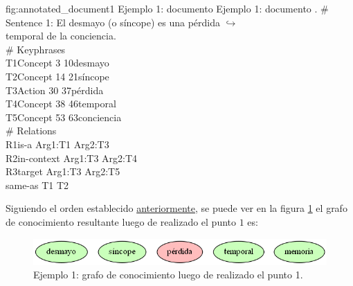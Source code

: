 \begin{annexample}
[backgroundcolor=cyan!13]
{\textwidth}
{fig:annotated_document1}
{Ejemplo 1: documento }
{Ejemplo 1: documento .}
	\# Sentence 1: El desmayo (o síncope) es una pérdida {\scriptsize $\hookrightarrow$}\\
	temporal de la conciencia.\\
	\# Keyphrases\\
	T1\space\space Concept 3 10\space\space\space\space desmayo\\
	T2\space\space Concept 14 21\space\space\space síncope\\
	T3\space\space Action 30 37\space\space\space\space pérdida\\
	T4\space\space Concept 38 46\space\space\space temporal\\
	T5\space\space Concept 53 63\space\space\space conciencia\\
	\# Relations\\
	R1\space\space is-a Arg1:T1 Arg2:T3\\
	R2\space\space in-context Arg1:T3 Arg2:T4\\
	R3\space\space target Arg1:T3 Arg2:T5\\
	\textasteriskcentered\space\space\space same-as T1 T2
\end{annexample}

Siguiendo el orden establecido \hyperref[enum:knowledge_graph_build_order]{anteriormente}, se puede ver en la figura \ref{fig:knowledge_graph1.1} el grafo de conocimiento resultante luego de realizado el punto $1$ es:

\begin{figure}[H]
	\begin{center}
		\includegraphics[width=4.5in]{graphics/knowledge_graph_example1_1.png}
		\caption[Ejemplo 1: grafo de conocimiento luego de realizado el punto 1]{Ejemplo 1: grafo de conocimiento luego de realizado el punto 1.}
		\label{fig:knowledge_graph1.1}
	\end{center}
\end{figure}

